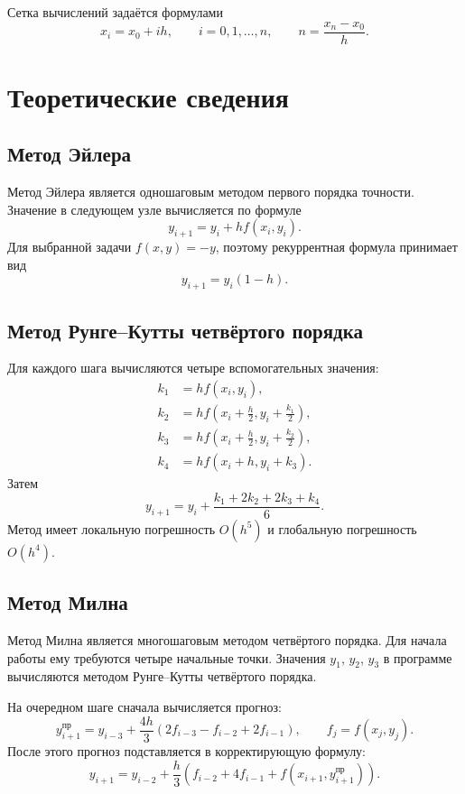 \documentclass[12pt,a4paper]{article}
\begin{document}
Сетка вычислений задаётся формулами
\begin{equation}
    x_i=x_0+ih, \qquad i=0,1,\ldots,n, \qquad n=\frac{x_n-x_0}{h}.
\end{equation}

\section{Теоретические сведения}
\subsection{Метод Эйлера}
Метод Эйлера является одношаговым методом первого порядка точности. Значение в следующем узле вычисляется по формуле
\begin{equation}
    y_{i+1}=y_i+h f(x_i,y_i).
\end{equation}
Для выбранной задачи $f(x,y)=-y$, поэтому рекуррентная формула принимает вид
\begin{equation}
    y_{i+1}=y_i(1-h).
\end{equation}

\subsection{Метод Рунге--Кутты четвёртого порядка}
Для каждого шага вычисляются четыре вспомогательных значения:
\begin{align}
 k_1&=h f(x_i,y_i),\\
 k_2&=h f\left(x_i+\frac h2,y_i+\frac{k_1}{2}\right),\\
 k_3&=h f\left(x_i+\frac h2,y_i+\frac{k_2}{2}\right),\\
 k_4&=h f(x_i+h,y_i+k_3).
\end{align}
Затем
\begin{equation}
    y_{i+1}=y_i+\frac{k_1+2k_2+2k_3+k_4}{6}.
\end{equation}
Метод имеет локальную погрешность $O(h^5)$ и глобальную погрешность $O(h^4)$.

\subsection{Метод Милна}
Метод Милна является многошаговым методом четвёртого порядка. Для начала работы ему требуются четыре начальные точки. Значения $y_1$, $y_2$, $y_3$ в программе вычисляются методом Рунге--Кутты четвёртого порядка.

На очередном шаге сначала вычисляется прогноз:
\begin{equation}
 y_{i+1}^{\text{пр}}=y_{i-3}+\frac{4h}{3}\left(2f_{i-3}-f_{i-2}+2f_{i-1}\right),
 \qquad f_j=f(x_j,y_j).
\end{equation}
После этого прогноз подставляется в корректирующую формулу:
\begin{equation}
 y_{i+1}=y_{i-2}+\frac h3\left(f_{i-2}+4f_{i-1}+f(x_{i+1},y_{i+1}^{\text{пр}})\right).
\end{equation}
\end{document}
